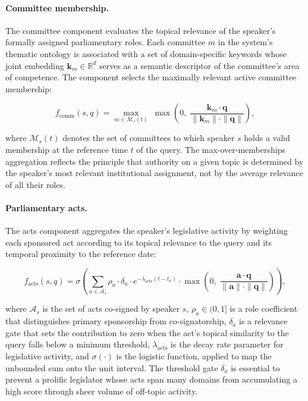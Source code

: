 \paragraph{Committee membership.}
The committee component evaluates the topical relevance of the speaker's formally assigned
parliamentary roles. Each committee $m$ in the system's thematic ontology is associated with
a set of domain-specific keywords whose joint embedding $\mathbf{k}_m \in \mathbb{R}^d$ serves
as a semantic descriptor of the committee's area of competence. The component selects the
maximally relevant active committee membership:

\begin{equation}
    f_\text{comm}(s, q) = \max_{m \in \mathcal{M}_s(t)}\; \max\!\left(0,\; \frac{\mathbf{k}_m \cdot \mathbf{q}}{\|\mathbf{k}_m\| \cdot \|\mathbf{q}\|}\right),
\end{equation}

where $\mathcal{M}_s(t)$ denotes the set of committees to which speaker $s$ holds a valid
membership at the reference time $t$ of the query. The max-over-memberships aggregation reflects
the principle that authority on a given topic is determined by the speaker's most relevant
institutional assignment, not by the average relevance of all their roles.

\paragraph{Parliamentary acts.}
The acts component aggregates the speaker's legislative activity by weighting each sponsored
act according to its topical relevance to the query and its temporal proximity to the reference
date:

\begin{equation}
    f_\text{acts}(s, q) = \sigma\!\left(\sum_{a \in \mathcal{A}_s} \rho_a \cdot \delta_a \cdot e^{-\lambda_\text{acts}(t - t_a)} \cdot \max\!\left(0,\; \frac{\mathbf{a} \cdot \mathbf{q}}{\|\mathbf{a}\| \cdot \|\mathbf{q}\|}\right)\right),
\end{equation}

where $\mathcal{A}_s$ is the set of acts co-signed by speaker $s$, $\rho_a \in (0, 1]$ is a
role coefficient that distinguishes primary sponsorship from co-signatorship, $\delta_a$ is a
relevance gate that sets the contribution to zero when the act's topical similarity to the
query falls below a minimum threshold, $\lambda_\text{acts}$ is the decay rate parameter for
legislative activity, and $\sigma(\cdot)$ is the logistic function, applied to map the unbounded
sum onto the unit interval. The threshold gate $\delta_a$ is essential to prevent a prolific
legislator whose acts span many domains from accumulating a high score through sheer volume
of off-topic activity.

